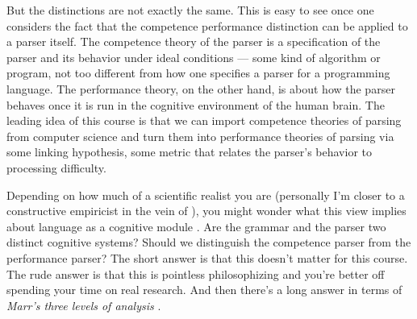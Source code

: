 But the distinctions are not exactly the same.
This is easy to see once one considers the fact that the competence performance distinction can be applied to a parser itself.
The competence theory of the parser is a specification of the parser and its behavior under ideal conditions --- some kind of algorithm or program, not too different from how one specifies a parser for a programming language.
The performance theory, on the other hand, is about how the parser behaves once it is run in the cognitive environment of the human brain.
The leading idea of this course is that we can import competence theories of parsing from computer science and turn them into performance theories of parsing via some linking hypothesis, some metric that relates the parser's behavior to processing difficulty.

Depending on how much of a scientific realist you are (personally I'm closer to a constructive empiricist in the vein of \citealt{Fraassen80}), you might wonder what this view implies about language as a cognitive module \citep[cf.][]{Chomsky86a, Fodor83}.
Are the grammar and the parser two distinct cognitive systems?
Should we distinguish the competence parser from the performance parser?
The short answer is that this doesn't matter for this course.
The rude answer is that this is pointless philosophizing and you're better off spending your time on real research.
And then there's a long answer in terms of \emph{Marr's three levels of analysis} \citep{MarrPoggio76}.

